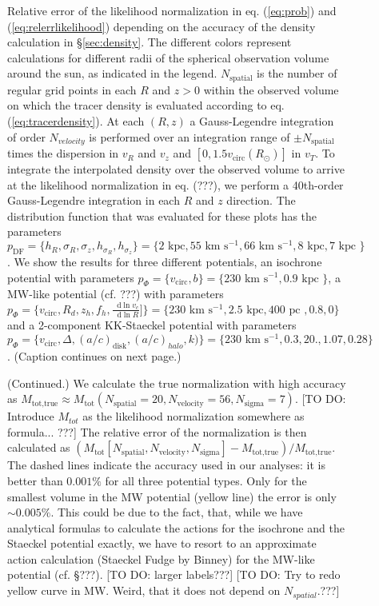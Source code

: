 \documentclass[12pt,preprint]{aastex}
\newcommand*\diff{\mathop{}\!\mathrm{d}}
\begin{document}
\begin{figure}
\caption{Relative error of the likelihood normalization in eq. (\ref{eq:prob}) and (\ref{eq:relerrlikelihood}) depending on the accuracy of the density calculation in \S\ref{sec:density}. The different colors represent calculations for different radii of the spherical observation volume around the sun, as indicated in the legend. $N_\text{spatial}$ is the number of regular grid points in each $R$ and $z > 0$ within the observed volume on which the tracer density is evaluated according to eq. (\ref{eq:tracerdensity}). At each $(R,z)$ a Gauss-Legendre integration of order $N_{velocity}$ is performed over an integration range of $\pm N_\text{spatial}$ times the dispersion in $v_R$ and $v_z$ and $[0,1.5v_\text{circ}(R_\odot)]$ in $v_T$. To integrate the interpolated density over the observed volume to arrive at the likelihood normalization in eq. (???), we perform a 40th-order Gauss-Legendre integration in each $R$ and $z$ direction. The distribution function that was evaluated for these plots has the parameters $p_\text{DF} = \{ h_R, \sigma_R, \sigma_z,h_{\sigma_R},h_{\sigma_z}\} =\{2 \text{ kpc}, 55 \text{ km s$^{-1}$}, 66 \text{ km s$^{-1}$}, 8 \text{ kpc}, 7 \text{ kpc }\} $. We show the results for three different potentials, an isochrone potential with parameters $p_\Phi = \{v_\text{circ},b \}=\{230 \text{ km s$^{-1}$},0.9\text{ kpc } \}$, a MW-like potential (cf. ???) with parameters $p_\Phi = \{v_\text{circ},R_d,z_h,f_h,\frac{\diff\ln v_c}{\diff\ln R}] \}=\{230 \text{ km s$^{-1}$},2.5\text{ kpc},400 \text{ pc }, 0.8,0\}$ and a 2-component KK-Staeckel potential with parameters $p_\Phi = \{v_\text{circ}, \Delta, (a/c)_\text{disk},(a/c)_{halo},k)\} = \{230\text{ km s$^{-1}$},0.3,20.,1.07, 0.28\}$. (Caption continues on next page.)} 
\label{fig:norm_accuracy}
\end{figure}

\addtocounter{figure}{-1}
\begin{figure} [t!]
  \caption{(Continued.) We calculate the true normalization with high accuracy as $M_\text{tot,true} \approx M_\text{tot}(N_\text{spatial}=20,N_\text{velocity}=56,N_\text{sigma}=7)$. [TO DO: Introduce $M_{tot}$ as the likelihood normalization somewhere as formula... ???] The relative error of the normalization is then calculated as $(M_\text{tot}[N_\text{spatial},N_\text{velocity},N_\text{sigma}] -  M_\text{tot,true} ) / M_\text{tot,true} $. The dashed lines indicate the accuracy used in our analyses: it is better than $0.001\%$ for all three potential types. Only for the smallest volume in the MW potential (yellow line) the error is only $\sim 0.005\%$. This could be due to the fact, that, while we have analytical formulas to calculate the actions for the isochrone and the Staeckel potential exactly, we have to resort to an approximate action calculation (Staeckel Fudge by Binney) for the MW-like potential (cf. \S ???). [TO DO: larger labels???] [TO DO: Try to redo yellow curve in MW. Weird, that it does not depend on $N_{spatial}$.???]}
\end{figure}
\end{document}
